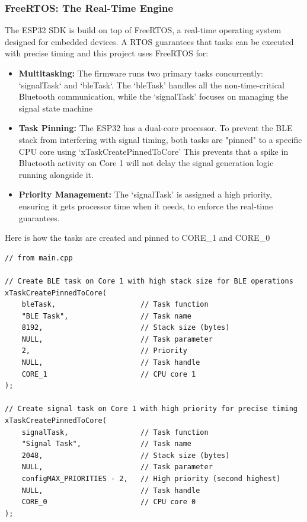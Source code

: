 \subsubsection{FreeRTOS: The Real-Time Engine}
The ESP32 SDK is build on top of FreeRTOS, a real-time operating system designed for embedded devices.
A RTOS guarantees that tasks can be executed with precise timing and this project uses FreeRTOS for:

\begin{itemize}
    \item \textbf{Multitasking:} The firmware runs two primary tasks concurrently: `signalTask` and `bleTask`. The `bleTask'
          handles all the non-time-critical Bluetooth communication, while the `signalTask' focuses on managing the signal
          state machine
    \item \textbf{Task Pinning:} The ESP32 has a dual-core processor. To prevent the BLE stack from interfering with signal
          timing, both tasks are "pinned" to a specific CPU core using `xTaskCreatePinnedToCore' This prevents that a spike in
          Bluetooth activity on Core 1 will not delay the signal generation logic running alongside it.
    \item \textbf{Priority Management:} The `signalTask' is assigned a high priority, ensuring it gets processor time
          when it needs, to enforce the real-time guarantees.
\end{itemize}

Here is how the tasks are created and pinned to CORE\_1 and CORE\_0

\begin{lstlisting}[caption={Example of FreeRTOS Task Creation}]
// from main.cpp

// Create BLE task on Core 1 with high stack size for BLE operations
xTaskCreatePinnedToCore(
    bleTask,                    // Task function
    "BLE Task",                 // Task name
    8192,                       // Stack size (bytes)
    NULL,                       // Task parameter
    2,                          // Priority
    NULL,                       // Task handle
    CORE_1                      // CPU core 1
);

// Create signal task on Core 1 with high priority for precise timing
xTaskCreatePinnedToCore(
    signalTask,                 // Task function
    "Signal Task",              // Task name
    2048,                       // Stack size (bytes)
    NULL,                       // Task parameter
    configMAX_PRIORITIES - 2,   // High priority (second highest)
    NULL,                       // Task handle
    CORE_0                      // CPU core 0
);
\end{lstlisting}

